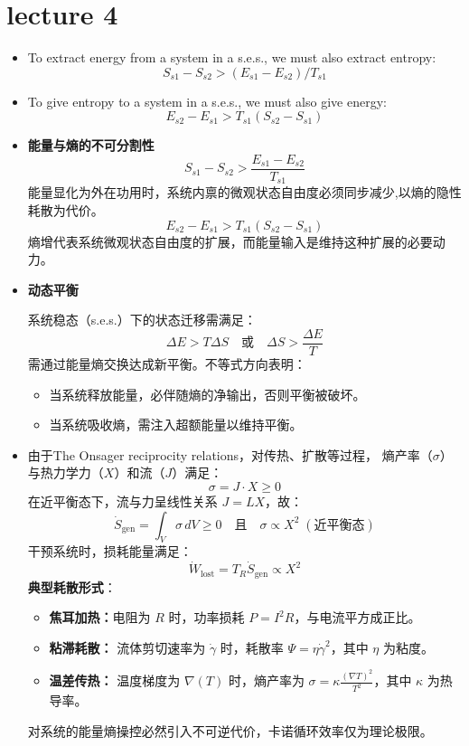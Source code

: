 \section{lecture 4}
\begin{thm}
    \indent
    \begin{itemize}
        \item To extract energy from a system in a s.e.s., we must also extract entropy:
        \[
        S_{s1} - S_{s2} > (E_{s1} - E_{s2}) / T_{s1}
        \]
        \item To give entropy to a system in a s.e.s., we must also give energy:
        \[
        E_{s2} - E_{s1} > T_{s1}(S_{s2} - S_{s1})
        \]
    \end{itemize}
    \begin{add}
\begin{itemize}
    \item \textbf{能量与熵的不可分割性}  
    \[
    S_{s1} - S_{s2} > \frac{E_{s1} - E_{s2}}{T_{s1}}
    \]
    能量显化为外在功用时，系统内禀的微观状态自由度必须同步减少,以熵的隐性耗散为代价。
    \[
    E_{s2} - E_{s1} > T_{s1}(S_{s2} - S_{s1})
    \]
    熵增代表系统微观状态自由度的扩展，而能量输入是维持这种扩展的必要动力。
    \item \textbf{动态平衡}  
    
    系统稳态（s.e.s.）下的状态迁移需满足：
    \[
    \Delta E > T\Delta S \quad \text{或} \quad \Delta S > \frac{\Delta E}{T}
    \]
    需通过能量\textminus 熵交换达成新平衡。不等式方向表明：
    \begin{itemize}
        \item 当系统释放能量，必伴随熵的净输出，否则平衡被破坏。
        \item 当系统吸收熵，需注入超额能量以维持平衡。
    \end{itemize}

    \item    
    由于The Onsager reciprocity relations，对传热、扩散等过程，
    熵产率（\(\sigma\)）与热力学力（\(X\)）和流（\(J\)）满足：
    \[
    \sigma = J \cdot X \geq 0
    \]
在近平衡态下，流与力呈线性关系 \(J = L X\)，故：
\[
\dot{S}_{\text{gen}} = \int_V \sigma \, dV \geq 0 \quad \text{且} \quad \sigma \propto X^2 \; (\text{近平衡态})
\]
干预系统时，损耗能量满足：
\[
\dot{W}_{\text{lost}} = T_R \dot{S}_{\text{gen}} \propto X^2 
\]
\textbf{典型耗散形式}：
\begin{itemize}
\item \textbf{焦耳加热：}电阻为 \(R\) 时，功率损耗 \(P = I^2 R\)，与电流平方成正比。
\item \textbf{粘滞耗散：} 流体剪切速率为 \(\dot{\gamma}\) 时，耗散率 \( \Psi = \eta \dot{\gamma}^2 \)，其中 \(\eta\) 为粘度。
\item \textbf{温差传热：} 温度梯度为 \(\nabla(T)\) 时，熵产率为 \( \sigma = \kappa \frac{(\nabla T)^2}{T^2} \)，其中 \(\kappa\) 为热导率。
\end{itemize}
    对系统的能量\textminus 熵操控必然引入不可逆代价，卡诺循环效率仅为理论极限。
\end{itemize}
    \end{add}
\end{thm}
